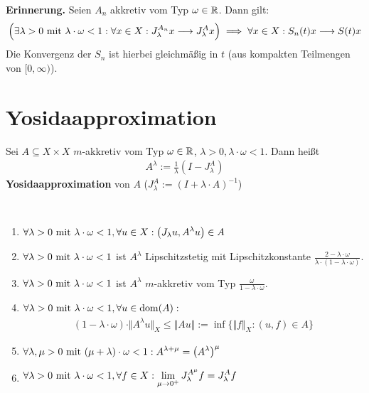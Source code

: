 \textbf{Erinnerung.}
Seien $A_n$ akkretiv vom Typ $\omega\in\R$. Dann gilt:
\begin{align*}
	\Big(\exists\lambda>0\mit\lambda\cdot\omega<1:\forall x\in X:
	J_\lambda^{A_n} x\longrightarrow J_\lambda^A x\Big)\implies\forall x\in X:S_n(t)x\longrightarrow S(t)x
\end{align*}
Die Konvergenz der $S_n$ ist hierbei gleichmäßig in $t$ (aus kompakten Teilmengen von $[0,\infty)$).

\section{Yosidaapproximation}
\begin{definition}
	Sei $A\subseteq X\times X$ $m$-akkretiv vom Typ $\omega\in\R$, $\lambda>0,\lambda\cdot\omega<1$.
	Dann heißt
	\begin{align*}
		A^\lambda:=\frac{1}{\lambda}\left(I-J_\lambda^A\right)
	\end{align*}
	\textbf{Yosidaapproximation} von $A$ ($J_\lambda^A:=(I+\lambda\cdot A)^{-1}$)
\end{definition}

\begin{theorem}\
	\begin{enumerate}[label=(\alph*)]
		\item $\begin{aligned}
			\forall\lambda>0\mit\lambda\cdot\omega<1,\forall u\in X:\big(J_\lambda u,A^\lambda u\big)\in A
		\end{aligned}$
		\item $\begin{aligned}
			\forall\lambda>0\mit\lambda\cdot\omega<1
		\end{aligned}$ ist $A^\lambda$ Lipschitzstetig mit Lipschitzkonstante $\frac{2-\lambda\cdot\omega}{\lambda\cdot(1-\lambda\cdot\omega)}$.
		\item $\forall\lambda>0\mit\lambda\cdot\omega<1$ ist $A^\lambda$ $m$-akkretiv vom Typ $\frac{\omega}{1-\lambda\cdot\omega}$.
		\item $\begin{aligned}
			\forall\lambda>0\mit\lambda\cdot\omega<1,\forall u\in\dom(A):			
		\end{aligned}$
		\begin{align*}
			(1-\lambda\cdot\omega)\cdot\Vert A^\lambda u\Vert_X\leq\Vert A u\Vert:=\inf\big\lbrace\Vert f\Vert_X:(u,f)\in A\big\rbrace
		\end{align*}
		\item $\begin{aligned}
			\forall\lambda,\mu>0\mit(\mu+\lambda)\cdot\omega<1:
			A^{\lambda+\mu}=\big(A^\lambda\big)^\mu
		\end{aligned}$
		\item $\begin{aligned}
			\forall\lambda>0\mit\lambda\cdot\omega<1,\forall f\in X:
			\lim\limits_{\mu\to0^+}J_\lambda^{A^\mu}f=J_\lambda^A f
		\end{aligned}$
	\end{enumerate}
\end{theorem}

